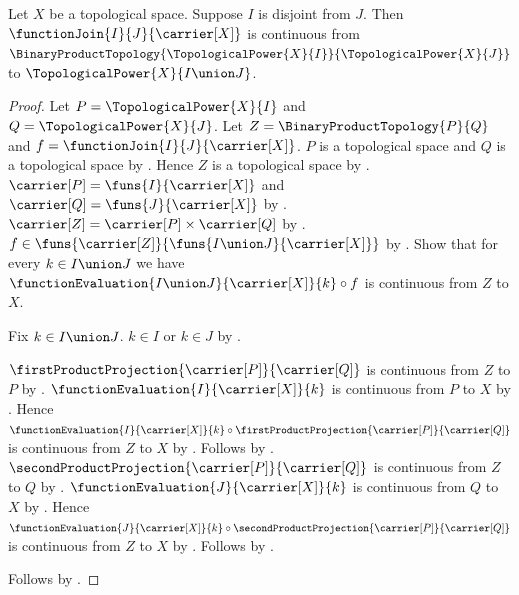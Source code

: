 \begin{theorem}\label{topological_power_join_continuous}
    Let $X$ be a topological space.
    Suppose $I$ is disjoint from $J$.
    Then $\functionJoin{I}{J}{\carrier[X]}$ is continuous from
        $\BinaryProductTopology{\TopologicalPower{X}{I}}{\TopologicalPower{X}{J}}$ to
        $\TopologicalPower{X}{I\union J}$.
\end{theorem}
\begin{proof}
    Let $P=\TopologicalPower{X}{I}$ and $Q=\TopologicalPower{X}{J}$.
    Let $Z=\BinaryProductTopology{P}{Q}$ and $f=\functionJoin{I}{J}{\carrier[X]}$.
    $P$ is a topological space and $Q$ is a topological space by
        .
    Hence $Z$ is a topological space by .
    $\carrier[P]=\funs{I}{\carrier[X]}$ and $\carrier[Q]=\funs{J}{\carrier[X]}$ by
        .
    $\carrier[Z]=\carrier[P]\times\carrier[Q]$ by .
    $f\in\funs{\carrier[Z]}{\funs{I\union J}{\carrier[X]}}$ by .
    Show that for every $k\in I\union J$ we have
        $\functionEvaluation{I\union J}{\carrier[X]}{k}\circ f$ is continuous from $Z$ to $X$.
    \begin{subproof}
        Fix $k\in I\union J$.
        $k\in I$ or $k\in J$ by .
        \begin{byCase}
                $\firstProductProjection{\carrier[P]}{\carrier[Q]}$ is continuous
                    from $Z$ to $P$ by .
                $\functionEvaluation{I}{\carrier[X]}{k}$ is continuous from $P$ to $X$ by
                    .
                Hence $\functionEvaluation{I}{\carrier[X]}{k}\circ
                    \firstProductProjection{\carrier[P]}{\carrier[Q]}$ is continuous from $Z$ to $X$
                    by .
                Follows by .
                $\secondProductProjection{\carrier[P]}{\carrier[Q]}$ is continuous
                    from $Z$ to $Q$ by .
                $\functionEvaluation{J}{\carrier[X]}{k}$ is continuous from $Q$ to $X$ by
                    .
                Hence $\functionEvaluation{J}{\carrier[X]}{k}\circ
                    \secondProductProjection{\carrier[P]}{\carrier[Q]}$ is continuous from $Z$ to $X$
                    by .
                Follows by .
        \end{byCase}
    \end{subproof}
    Follows by .
\end{proof}

